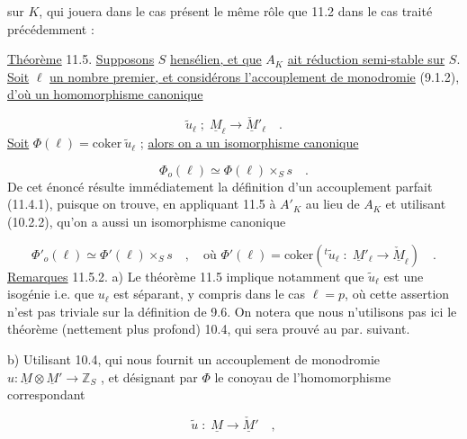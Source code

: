 
sur $K$, qui jouera dans le cas présent le même rôle que 11.2 dans le cas traité précédemment :

\underline{Théorème} 11.5. \underline{Supposons} $S$ \underline{hensélien, et que} $A_K$ \underline{ait réduction semi-stable sur} $S$. \underline{Soit} $\ell$ \underline{un nombre premier, et considérons l'accouplement de monodromie} (9.1.2), \underline{d'où un homomorphisme canonique}

\begin{equation*}
\widetilde{u}_{\ell} \; ; \; \underline{M}_{\ell} \longrightarrow \underline{\check{M}}'_{\ell} \quad .
\end{equation*}
\underline{Soit} $\Phi(\ell) = \mathrm{coker}\ \widetilde{u}_{\ell}$ ; \underline{alors on a un isomorphisme canonique}

\begin{equation}\tag{11.5.1}
\Phi_o(\ell) \simeq \Phi(\ell)\times_S s \quad .
\end{equation}
De cet énoncé résulte immédiatement la définition d'un accouplement parfait (11.4.1), puisque on trouve, en appliquant 11.5 à $A'_K$ au lieu de $A_K$ et utilisant (10.2.2), qu'on a aussi un isomorphisme canonique

\begin{equation*}
\Phi'_o(\ell) \simeq \Phi'(\ell)\times_S s \quad , \quad \text{où } \Phi'(\ell) = \mathrm{coker}({}^t\widetilde{u}_{\ell} \; : \; \underline{M}'_{\ell} \longrightarrow \underline{\check{M}}_{\ell}) \quad .
\end{equation*}
\underline{Remarques} 11.5.2. a) Le théorème 11.5 implique notamment que $\widetilde{u}_{\ell}$ est une isogénie i.e. que $u_{\ell}$ est séparant, y compris dans le cas $\ell = p$, où cette assertion n'est pas triviale sur la définition de 9.6. On notera que nous n'utilisons pas ici le théorème (nettement plus profond) 10.4, qui sera prouvé au par. suivant.

b) Utilisant 10.4, qui nous fournit un accouplement de monodromie $u: \underline{M} \otimes \underline{M}' \longrightarrow \mathbb{Z}_S$ , et désignant par $\Phi$ le conoyau de l'homomorphisme correspondant

\begin{equation*}
\widetilde{u} \; : \; \underline{M} \longrightarrow \underline{\check{M}}' \quad ,
\end{equation*}


